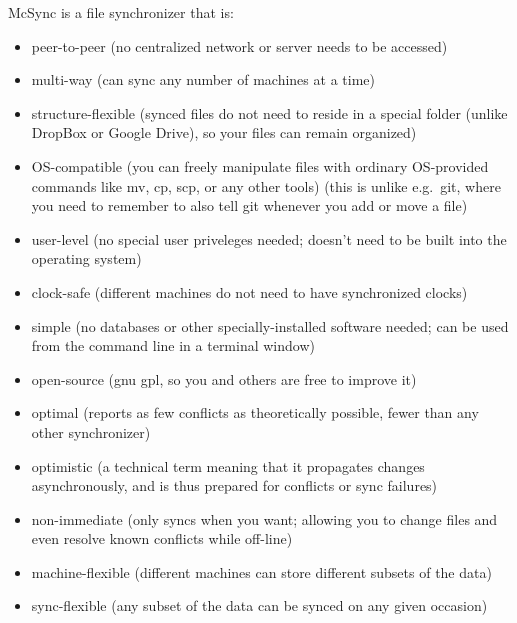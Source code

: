 \documentclass{book}
\begin{document}
\noindent McSync is a file synchronizer that is:
\begin{itemize}\label{features}
\itemsep -4pt

\item peer-to-peer
(no centralized network or server needs to be accessed)

\item multi-way
(can sync any number of machines at a time)

\item structure-flexible
(synced files do not need to reside in a special folder (unlike DropBox or Google Drive),
so your files can remain organized)

\item OS-compatible
(you can freely manipulate files with ordinary OS-provided commands like mv, cp, scp, or any other tools) (this is unlike e.g.\ git, where you need to remember to also tell git whenever you add or move a file)

\item user-level
(no special user priveleges needed; doesn't need to be built into the operating system)

\item clock-safe
(different machines do not need to have synchronized clocks)

\item simple
(no databases or other specially-installed software needed; can be used from the command line in a terminal window)

\item open-source
(gnu gpl, so you and others are free to improve it)

\item optimal
(reports as few conflicts as theoretically possible, fewer than any other synchronizer)

\item optimistic
(a technical term meaning that it propagates changes asynchronously, and is thus prepared for conflicts or sync failures)

\item non-immediate
(only syncs when you want; allowing you to change files and even resolve known conflicts while off-line)

\item machine-flexible
(different machines can store different subsets of the data)

\item sync-flexible
(any subset of the data can be synced on any given occasion)


\end{itemize}
\end{document}
